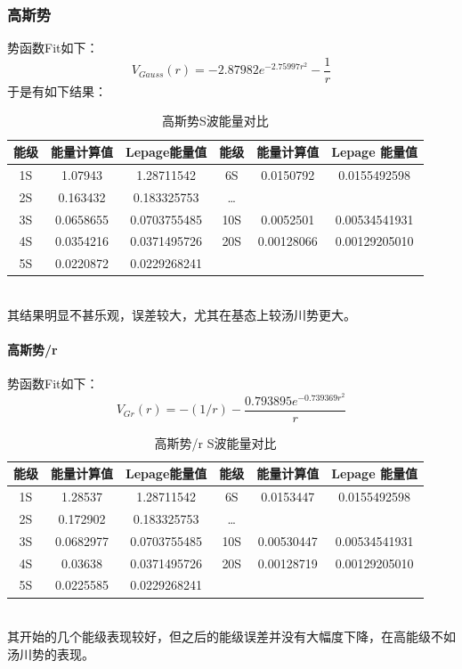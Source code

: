 \documentclass[hyperref,cs4size,titlepage,twoside]{ctexart}
\begin{document}
\subsubsection{高斯势}
势函数Fit如下：
\begin{equation}
  V_{Gauss}(r)=-2.87982 e^{-2.75997 r^2}-\frac{1}{r}
\end{equation}
于是有如下结果：
\begin{table}[!htbp]
  \centering
  \begin{tabular}{|cccccc|}
    \hline
    能级 & 能量计算值 & Lepage能量值 & 能级 & 能量计算值 & Lepage 能量值 \\
    \hline
    1S & 1.07943 & 1.28711542 & 6S & 0.0150792 & 0.0155492598 \\
    2S & 0.163432 & 0.183325753  & \dots &   & \\
    3S & 0.0658655 & 0.0703755485 & 10S & 0.0052501 & 0.00534541931 \\
    4S & 0.0354216 & 0.0371495726 & 20S & 0.00128066 & 0.00129205010 \\
    5S & 0.0220872 & 0.0229268241  &  &  &  \\
    \hline
  \end{tabular}
  \caption{高斯势S波能量对比}
\end{table}\\
其结果明显不甚乐观，误差较大，尤其在基态上较汤川势更大。

\paragraph{高斯势/r}
势函数Fit如下：
\begin{equation}
  V_{Gr}(r)=-(1/r) - \frac{0.793895 e^{-0.739369 r^2}}{r}
\end{equation}
\begin{table}[!htbp]
  \centering
  \begin{tabular}{|cccccc|}
    \hline
    能级 & 能量计算值 & Lepage能量值 & 能级 & 能量计算值 & Lepage 能量值 \\
    \hline
    1S & 1.28537 & 1.28711542 & 6S & 0.0153447 & 0.0155492598 \\
    2S & 0.172902 & 0.183325753  & \dots &   & \\
    3S & 0.0682977 & 0.0703755485 & 10S & 0.00530447 & 0.00534541931 \\
    4S & 0.03638 & 0.0371495726 & 20S & 0.00128719 & 0.00129205010 \\
    5S & 0.0225585 & 0.0229268241  &  &  &  \\
    \hline
  \end{tabular}
  \caption{高斯势/r S波能量对比}
\end{table}\\
其开始的几个能级表现较好，但之后的能级误差并没有大幅度下降，在高能级不如汤川势的表现。
\end{document}
